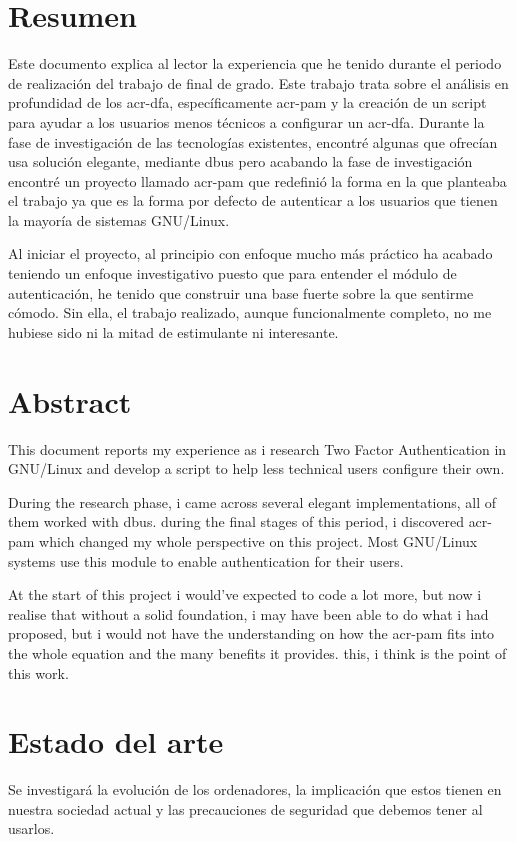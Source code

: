 \documentclass[twoside, titlepage, 12pt, a4paper]{article}
\let\oldsection\section
\def\section{\cleardoublepage\oldsection}
\begin{document}
\section*{Resumen}
Este documento explica al lector la experiencia que he tenido durante el periodo de realización del trabajo de final de grado. Este trabajo trata sobre el análisis en profundidad de los \gls{acr-dfa}, específicamente \gls{acr-pam} y la creación de un \gls{script} para ayudar a los usuarios menos técnicos a configurar un \gls{acr-dfa}.
Durante la fase de investigación de las tecnologías existentes, encontré algunas que ofrecían usa solución elegante, mediante \gls{dbus} pero acabando la fase de investigación encontré un proyecto llamado \gls{acr-pam} que redefinió la forma en la que planteaba el trabajo ya que es la forma por defecto de autenticar a los usuarios que tienen la mayoría de sistemas \gls{GNU/Linux}.\par 
Al iniciar el proyecto, al principio con enfoque mucho más práctico ha acabado teniendo un enfoque investigativo puesto que para entender el módulo de autenticación, he tenido que construir una base fuerte sobre la que sentirme cómodo. Sin ella, el trabajo realizado, aunque funcionalmente completo, no me hubiese sido ni la mitad de estimulante ni interesante.
\clearpage
\section*{Abstract}
This document reports my experience as i research Two Factor Authentication in \gls{GNU/Linux} and develop a script to help less technical users configure their own. \par
During the research phase, i came across several elegant implementations, all of them worked with \gls{dbus}. during the final stages of this period, i discovered \gls{acr-pam} which changed my whole perspective on this project. Most \gls{GNU/Linux} systems use this module to enable authentication for their users.\par
At the start of this project i would've expected to code a lot more, but now i realise that without a solid foundation, i may have been able to do what i had proposed, but i would not have the understanding on how the \gls{acr-pam} fits into the whole equation and the many benefits it provides. this, i think is the point of this work.
\clearpage

\tableofcontents
\clearpage
\listoffigures
\clearpage
{}
\section{Estado del arte}
Se investigará la evolución de los ordenadores, la implicación que estos tienen en nuestra sociedad actual y las precauciones de seguridad que debemos tener al usarlos.
\end{document}
